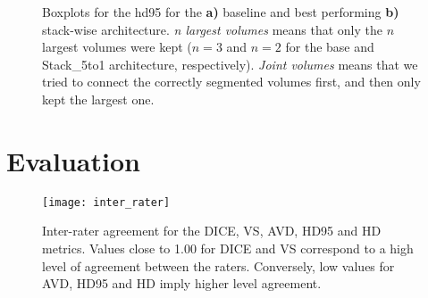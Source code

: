 \begin{figure}[htbp]
	\centering
	\hfill
	\caption[Post-processing impact on \acrlong{hd95}]{Boxplots for the \acrlong{hd95} for the \textbf{a)} baseline and best performing \textbf{b)} stack-wise architecture. \textit{n largest volumes} means that only the $n$ largest volumes were kept ($n = 3$ and $n = 2$ for the base and Stack\_5to1 architecture, respectively). \textit{Joint volumes} means that we tried to connect the correctly segmented volumes first, and then only kept the largest one.}
	\label{fig:pp_boxplots_hd95}  
\end{figure}





\section{Evaluation} \label{sec:exp_evaluation} %
\begin{figure}[htbp]	
	\texttt{[image: inter\_rater]}
    \caption[Inter-Rater Agreement]{Inter-rater agreement for the DICE, VS, AVD, HD95 and HD metrics. Values close to 1.00 for DICE and VS correspond to a high level of agreement between the raters. Conversely, low values for AVD, HD95 and HD imply higher level agreement.}
    \label{fig:res_inter_rater}
\end{figure}





\endinput